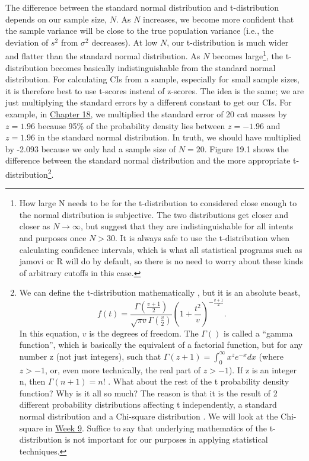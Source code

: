 \documentclass[
]{scrbook}
\begin{document}
The difference between the standard normal distribution and t-distribution depends on our sample size, \(N\).
As \(N\) increases, we become more confident that the sample variance will be close to the true population variance (i.e., the deviation of \(s^{2}\) from \(\sigma^{2}\) decreases).
At low \(N\), our t-distribution is much wider and flatter than the standard normal distribution.
As \(N\) becomes large\footnote{How large N needs to be for the t-distribution to considered close enough to the normal distribution is subjective. The two distributions get closer and closer as \(N \to \infty\), but \citet{Sokal1995} suggest that they are indistinguishable for all intents and purposes once \(N > 30\). It is always safe to use the t-distribution when calculating confidence intervals, which is what all statistical programs such as jamovi or R will do by default, so there is no need to worry about these kinds of arbitrary cutoffs in this case.}, the t-distribution becomes basically indistinguishable from the standard normal distribution.
For calculating CIs from a sample, especially for small sample sizes, it is therefore best to use t-scores instead of z-scores.
The idea is the same; we are just multiplying the standard errors by a different constant to get our CIs.
For example, in \protect\hyperlink{Chapter_18}{Chapter 18}, we multiplied the standard error of 20 cat masses by \(z = 1.96\) because 95\% of the probability density lies between \(z = -1.96\) and \(z = 1.96\) in the standard normal distribution.
In truth, we should have multiplied by -2.093 because we only had a sample size of \(N = 20\).
Figure 19.1 shows the difference between the standard normal distribution and the more appropriate t-distribution\footnote{We can define the t-distribution mathematically \citep{Miller2004}, but it is an absolute beast, \[f(t) = \frac{\Gamma\left(\frac{v + 1}{2} \right)}{\sqrt{\pi v} \Gamma{\left(\frac{v}{2}\right)}}\left(1 + \frac{t^{2}}{v} \right)^{-\frac{v + 1}{2}}.\] In this equation, \(v\) is the degrees of freedom. The \(\Gamma\left(\right)\) is called a ``gamma function'', which is basically the equivalent of a factorial function, but for any number z (not just integers), such that \(\Gamma(z + 1) = \int_{0}^{\infty}x^{z}e^{-x}dx\) (where \(z > -1\), or, even more technically, the real part of \(z > -1\)). If z is an integer n, then \(\Gamma\left({n + 1}\right) = n!\) \citep{Borowski2005}. What about the rest of the t probability density function? Why is it all so much? The reason is that it is the result of 2 different probability distributions affecting t independently, a standard normal distribution and a Chi-square distribution \citep{Miller2004}. We will look at the Chi-square in \protect\hyperlink{Week_9}{Week 9}. Suffice to say that underlying mathematics of the t-distribution is not important for our purposes in applying statistical techniques.}.
\end{document}
